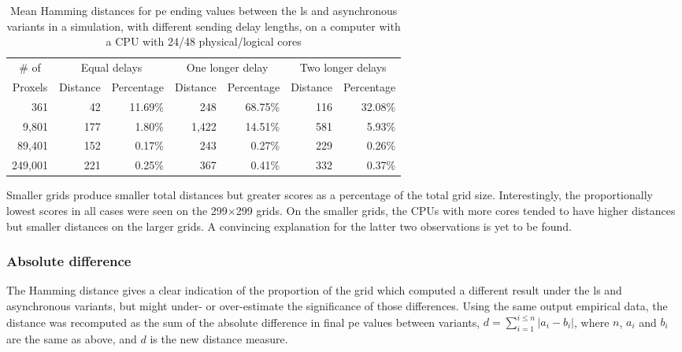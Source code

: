 \begin{table}
\centering
\begin{tabular}{@{}r|rr|rr|rr@{}}
\toprule
\multicolumn{1}{c|}{\# of}   & \multicolumn{2}{c|}{Equal delays} & \multicolumn{2}{c|}{One longer delay} & \multicolumn{2}{c}{Two longer delays} \\ \cmidrule(l){2-7} 
\multicolumn{1}{c|}{Proxels} & Distance     & Percentage     & Distance      & Percentage      & Distance      & Percentage      \\ \midrule
361  & 42  & 11.69\% & 248  & 68.75\% & 116  & 32.08\% \\
9,801  & 177  & 1.80\% & 1,422  & 14.51\% & 581  & 5.93\% \\
89,401  & 152  & 0.17\% & 243  & 0.27\% & 229  & 0.26\% \\
249,001  & 221  & 0.25\% & 367  & 0.41\% & 332  & 0.37\% \\ \bottomrule
\end{tabular}%
\caption[Mean Hamming distances for  ending values between the \gls{ls} and asynchronous variants on a 48-core CPU]{Mean Hamming distances for \gls{pe} ending values between the \gls{ls} and asynchronous variants in a simulation, with different sending delay lengths, on a computer with a CPU with 24/48 physical/logical cores}
\label{tab:nmp:hamming48cores}
\end{table}

Smaller grids produce smaller total distances but greater scores as a percentage of the total grid size.  Interestingly, the proportionally lowest scores in all cases were seen on the 299×299 grids.  On the smaller grids, the CPUs with more cores tended to have higher distances but smaller distances on the larger grids.  A convincing explanation for the latter two observations is yet to be found.

\subsubsection{Absolute difference}
The Hamming distance gives a clear indication of the proportion of the grid which computed a different result under the \gls{ls} and asynchronous variants, but might under- or over-estimate the significance of those differences.  Using the same output empirical data, the distance was recomputed as the sum of the absolute difference in final \gls{pe} values between variants, \ie{} \( d = \sum_{i = 1}^{i \leq n} |a_i - b_i| \), where \(n\), \(a_i\) and \(b_i\) are the same as above, and \(d\) is the new distance measure.

